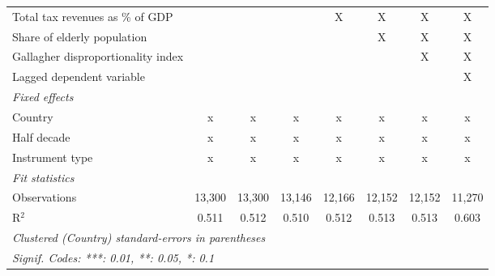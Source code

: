 \begin{table}[htbp]
\begin{tabular}{lccccccc}
      Total tax revenues as \% of GDP                                 &                &                &               & X             & X             & X             & X\\  
      Share of elderly population                                     &                &                &               &               & X             & X             & X\\  
      Gallagher disproportionality index                              &                &                &               &               &               & X             & X\\  
      Lagged dependent variable                                       &                &                &               &               &               &               & X\\  
      \emph{Fixed effects}\\
      Country                                                         & x              & x              & x             & x             & x             & x             & x\\  
      Half decade                                                     & x              & x              & x             & x             & x             & x             & x\\  
      Instrument type                                                 & x              & x              & x             & x             & x             & x             & x\\  
      \midrule \emph{Fit statistics}\\
      Observations                                                    & 13,300         & 13,300         & 13,146        & 12,166        & 12,152        & 12,152        & 11,270\\  
      R$^2$                                                           & 0.511          & 0.512          & 0.510         & 0.512         & 0.513         & 0.513         & 0.603\\  
      \midrule
      \multicolumn{8}{l}{\emph{Clustered (Country) standard-errors in parentheses}}\\
      \multicolumn{8}{l}{\emph{Signif. Codes: ***: 0.01, **: 0.05, *: 0.1}}\\
   \end{tabular}
\end{table}


